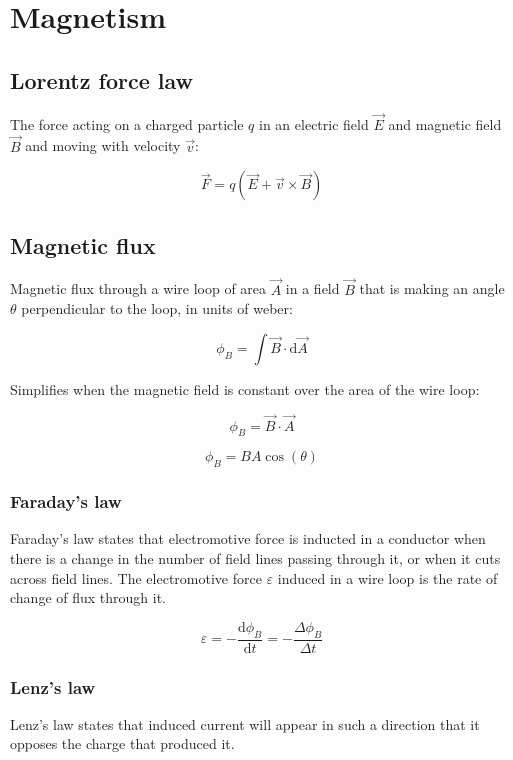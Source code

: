 \documentclass[12pt]{article}
\begin{document}
\newpage

\section{Magnetism}

\subsection{Lorentz force law}

The force acting on a charged particle $q$ in an electric field $\vec{E}$ and magnetic field $\vec{B}$ and moving with velocity $\vec{v}$:

\[
\boxed{\vec{F} = q\left(\vec{E} + \vec{v} \times \vec{B}\right)}
\]

\subsection{Magnetic flux}

Magnetic flux through a wire loop of area $\vec{A}$ in a field $\vec{B}$ that is making an angle $\theta$ perpendicular to the loop, in units of weber:

\[
\boxed{
\phi_B = \int \vec{B} \cdot \mathrm{d}\vec{A}
}
\]

Simplifies when the magnetic field is constant over the area of the wire loop:

\[
\boxed{
\phi_B = \vec{B} \cdot \vec{A}
}
\]

\[
\boxed{
\phi_B = BA\cos(\theta)
}
\]

\subsubsection{Faraday's law}

Faraday's law states that electromotive force is inducted in a conductor when there is a change in the number of field lines passing through it, or when it cuts across field lines. The electromotive force $\varepsilon$ induced in a wire loop is the rate of change of flux through it.

\[
\boxed{
\varepsilon = -\frac{\mathrm{d}\phi_B}{\mathrm{d}t} = -\frac{\Delta \phi_B}{\Delta t}
}
\]

\subsubsection{Lenz's law}

Lenz's law states that induced current will appear in such a direction that it opposes the charge that produced it.
\end{document}
